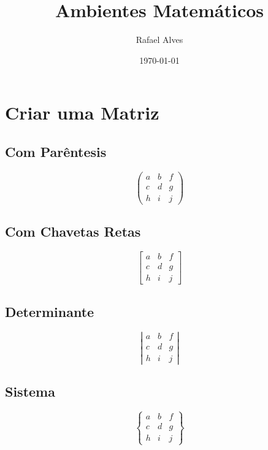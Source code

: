 \documentclass[12pt,a4paper]{article}
\title{Ambientes Matemáticos}
\author{Rafael Alves}
\date{\today}
\begin{document}
\maketitle

\section{Criar uma Matriz}
\subsection{Com Parêntesis}

$$  %
\left(\begin{array}{ccc}
    a   &   b   &   f\\
    c   &   d   &   g\\
    h   &   i   &   j
\end{array}\right)
$$

\subsection{Com Chavetas Retas}
$$  %
\left[\begin{array}{ccc}
    a   &   b   &   f\\
    c   &   d   &   g\\
    h   &   i   &   j
\end{array}\right]
$$

\subsection{Determinante}
$$
\left|\begin{array}{ccc}
    a   &   b   &   f\\
    c   &   d   &   g\\
    h   &   i   &   j
\end{array}\right|
$$

\subsection{Sistema}
\vspace{1cm}
$$
\left\{\begin{array}{ccc}
    a   &   b   &   f\\
    c   &   d   &   g\\
    h   &   i   &   j
\end{array}\right\}
$$
\vspace{1cm}
\end{document}
